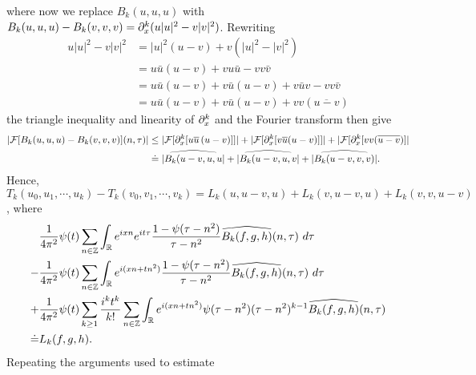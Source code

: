 %
where now we replace $B_k(u,u,u)$ with $B_k(u,u,u) - B_k(v,v,v) = \partial_x^k(u | u
|^2 - v | v |^{2})$. Rewriting
%
\begin{equation*}
  \begin{split}
    u | u |^{2} - v | v |^{2}
    & = | u |^2 \left( u -v \right) + v\left( | u 
    |^2 - | v |^2
    \right)
    \\
    & = u \bar u \left( u -v \right) + v u \bar u - v v \bar v
    \\
    & = u \bar u \left( u - v \right) + v \bar u\left( u - v \right) + v 
    \bar u v - v v \bar v
    \\
    & = u \bar u \left( u -v \right) + v \bar u\left( u - v \right) + v v 
    \left( \overline{u -v} \right)
  \end{split}
\end{equation*}
%
the triangle inequality and linearity of $\partial_x^k$ and the Fourier transform then give
%
\begin{equation*}
  \begin{split}
    | \mathcal{F}[{B_k}(u,u,u) - B_k(v,v,v)](n, \tau) |
    & \le | \mathcal{F}[\partial_x^k[u \overline{u} \left (u -v \right )]] | +
    | \mathcal{F}[\partial_x^k[v \overline{u} (u -v)]] | + |\mathcal{F}[\partial_x^k[v v 
    (\overline{u-v})]|
    \\
    & \doteq | \widehat{{B_k}(u-v, u, u} | + | \widehat{{B_k}(u-v, u, v} | + |
    \widehat{{B_k}(u-v,v,v)} |.
  \end{split}
\end{equation*}
%
%
Hence, $T_k(u_0, u_1,\cdots,u_k) - T_k(v_0, v_1, \cdots, v_k)
 = L_k(u, u-v,u) + L_k(v,u-v,u) + L_k(v, v, u-v)$, where
\begin{align}
  \label{pmain-int-exp-mod1}
  & \frac{1}{4 \pi^2} \psi(t) \sum_{n\in \mathbb{Z}} \int_{\mathbb{R}} e^{ixn}  
    e^{it \tau} \frac{ 1 - \psi(\tau - n^{2}) 
    }{\tau - n^{2}} \widehat{{B_k}(f,g,h)}(n, \tau) \ d \tau
    \\
    \label{pmain-int-exp-mod2}
    - & \frac{1}{4 \pi^2} \psi(t) \sum_{n\in \mathbb{Z}} \int_{\mathbb{R}} e^{i(xn + 
    tn^{2})}
    \frac{1- \psi(\tau - n^{2})}{\tau - n^{2}} \widehat{{B_k}(f,g,h)}(n, \tau) \ d \tau
    \\
    \label{pmain-int-exp-mod3}
    + & \frac{1}{4 \pi^2} \psi(t) \sum_{k \ge 1} \frac{i^k t^k}{k!}
    \sum_{n \in \mathbb{Z}} \int_{\mathbb{R}} e^{i(xn + tn^{2} )}
    \psi(\tau - n^{2}) (\tau - n^{2})^{k-1} \widehat{{B_k}(f,g,h)}(n, \tau)  
    \\
    \doteq & L_k(f,g,h). \notag
\end{align}
Repeating the arguments used to estimate 
